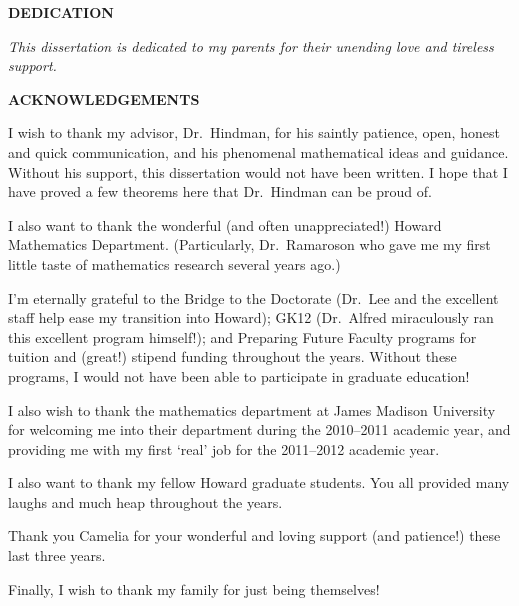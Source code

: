 \newcommand{\dedication}{
  \clearpage
  
  \begin{center}
    \textbf{DEDICATION}

    \vspace{3em}

    \textsl{This dissertation is dedicated to my parents for their unending love and tireless support.}
  \end{center}
}

\newcommand{\acknowledgements}{
  \clearpage
  \begin{center}
    \textbf{ACKNOWLEDGEMENTS}
  \end{center}

  I wish to thank my advisor, Dr.~Hindman, for his saintly patience, open, honest and quick communication, and his phenomenal mathematical ideas and guidance. 
  Without his support, this dissertation would not have been written.  
  I hope that I have proved a few theorems here that Dr.~Hindman can be proud of.

  I also want to thank the wonderful (and often unappreciated!) Howard Mathematics Department. 
  (Particularly, Dr.~Ramaroson who gave me my first little taste of mathematics research several years ago.)

  I'm eternally grateful to the Bridge to the Doctorate (Dr.~Lee and the excellent staff help ease my transition into Howard); GK12 (Dr.~Alfred miraculously ran this excellent program himself!); and Preparing Future Faculty programs for tuition and (great!) stipend funding throughout the years.  
  Without these programs, I would not have been able to participate in graduate education!

  I also wish to thank the mathematics department at James Madison University for welcoming me into their department during the 2010--2011 academic year, and providing me with my first `real' job for the 2011--2012 academic year.  

  I also want to thank my fellow Howard graduate students. 
  You all provided many laughs and much heap throughout the years.

  Thank you Camelia for your wonderful and loving support (and patience!) these last three years.

  Finally, I wish to thank my family for just being themselves!
}

\thetitlepage
\dedication
\acknowledgements
\approval